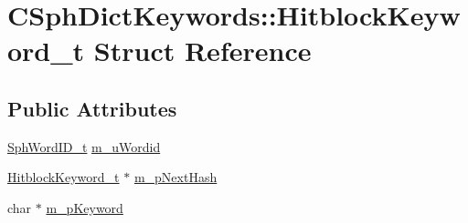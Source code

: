 \hypertarget{structCSphDictKeywords_1_1HitblockKeyword__t}{\section{C\-Sph\-Dict\-Keywords\-:\-:Hitblock\-Keyword\-\_\-t Struct Reference}
\label{structCSphDictKeywords_1_1HitblockKeyword__t}
}
\subsection*{Public Attributes}
\begin{DoxyCompactItemize}
\item 
\hyperlink{sphinx_8h_a80a94d5984fdf9214a98f3e5e65df963}{Sph\-Word\-I\-D\-\_\-t} \hyperlink{structCSphDictKeywords_1_1HitblockKeyword__t_a3aab5604363411e4798ae35948578594}{m\-\_\-u\-Wordid}
\item 
\hyperlink{structCSphDictKeywords_1_1HitblockKeyword__t}{Hitblock\-Keyword\-\_\-t} $\ast$ \hyperlink{structCSphDictKeywords_1_1HitblockKeyword__t_acc7119fb73e1f05c020400947e29de0a}{m\-\_\-p\-Next\-Hash}
\item 
char $\ast$ \hyperlink{structCSphDictKeywords_1_1HitblockKeyword__t_a9f214b97cf55e3e118b8091720b1d7f2}{m\-\_\-p\-Keyword}
\end{DoxyCompactItemize}


